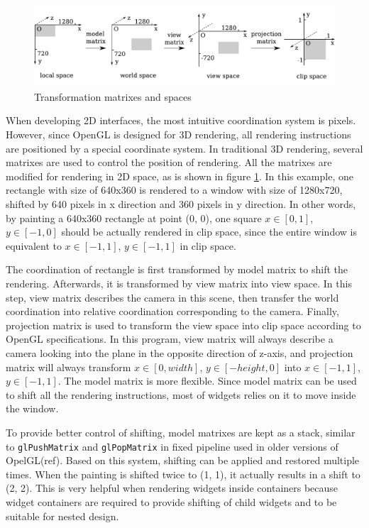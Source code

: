 \documentclass[msc,deptreport, cs]{infthesis}
\begin{document}
\begin{figure}[!htb]
  \centering
  \includegraphics[width=\columnwidth]{matrix.pdf}
  \caption{Transformation matrixes and spaces}
  \label{fig:matrix}
\end{figure}

When developing 2D interfaces, the most intuitive coordination system is pixels. However, since OpenGL is designed for 3D rendering, all rendering instructions are positioned by a special coordinate system. In traditional 3D rendering, several matrixes are used to control the position of rendering. All the matrixes are modified for rendering in 2D space, as is shown in figure \ref{fig:matrix}. In this example, one rectangle with size of 640x360 is rendered to a window with size of 1280x720, shifted by 640 pixels in x direction and 360 pixels in y direction. In other words, by painting a 640x360 rectangle at point (0, 0), one square $x\in[0, 1]$, $y\in[-1, 0]$ should be actually rendered in clip space, since the entire window is equivalent to $x\in[-1, 1]$, $y\in[-1, 1]$ in clip space.

The coordination of rectangle is first transformed by model matrix to shift the rendering. Afterwards, it is transformed by view matrix into view space. In this step, view matrix describes the camera in this scene, then transfer the world coordination into relative coordination corresponding to the camera. Finally, projection matrix is used to transform the view space into clip space according to OpenGL specifications. In this program, view matrix will always describe a camera looking into the plane in the opposite direction of z-axis, and projection matrix will always transform $x\in[0, width]$, $y\in[-height, 0]$ into $x\in[-1, 1]$, $y\in[-1, 1]$. The model matrix is more flexible. Since model matrix can be used to shift all the rendering instructions, most of widgets relies on it to move inside the window.

To provide better control of shifting, model matrixes are kept as a stack, similar to \verb+glPushMatrix+ and \verb+glPopMatrix+ in fixed pipeline used in older versions of OpelGL(ref). Based on this system, shifting can be applied and restored multiple times. When the painting is shifted twice to (1, 1), it actually results in a shift to (2, 2). This is very helpful when rendering widgets inside containers because widget containers are required to provide shifting of child widgets and to be suitable for nested design.
\end{document}
